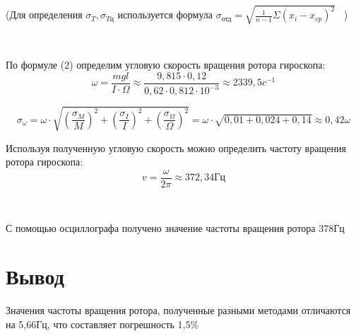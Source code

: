 \documentclass{article}
\begin{document}
(Для определения $\sigma_T , \sigma_{T\text{ц}}$ используется формула $\sigma_{\text{отд}} = \sqrt{\frac{1}{n-1}\Sigma(x_i-x_{cp})^2}$ \ )

\ 

\noindent
По формуле (2) определим угловую скорость вращения ротора гироскопа: $$\omega = \frac{mgl}{I\cdot\Omega} \approx \frac{9,815 \cdot 0,12}{0,62\cdot 0,812\cdot10^{-3}} \approx 2339,5c^{-1}$$

$$\sigma_{\omega} = \omega\cdot\sqrt{(\frac{\sigma_M}{M})^2  + (\frac{\sigma_I}{I})^2+ (\frac{\sigma_\Omega}{\Omega})^2}
= \omega\cdot\sqrt{0,01 + 0,024 + 0,14} \approx 0,42\omega$$

\noindent
Используя полученную угловую скорость можно определить частоту вращения ротора гироскопа: $$v = \frac{\omega}{2\pi} \approx 372,34 \text{Гц}$$

\

\noindent
С помощью осциллографа получено значение частоты вращения ротора 378Гц

\section*{Вывод}
Значения частоты вращения ротора, полученные разными методами отличаются на 5,66Гц, что составляет погрешность 1,5\% 
\end{document}
